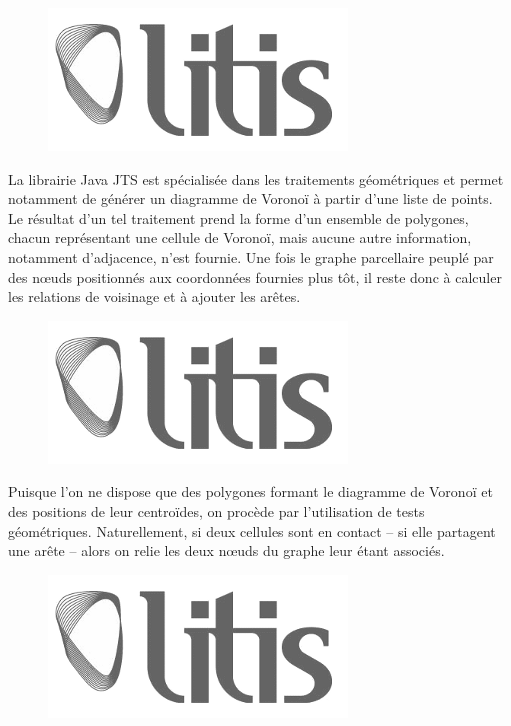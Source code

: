 \documentclass[12pt]{article}
\begin{document}
\begin{figure}
  \centering
  \includegraphics[width=.6\linewidth]{images/logo-litis.png}
  \caption{}
  \label{fig:construction-bati1}
\end{figure}

La librairie Java JTS \cite{JTS} est spécialisée dans les traitements
géométriques et permet notamment de générer un diagramme de Voronoï à
partir d'une liste de points. Le résultat d'un tel traitement prend la
forme d'un ensemble de polygones, chacun représentant une cellule de
Voronoï, mais aucune autre information, notamment d'adjacence, n'est
fournie. Une fois le graphe parcellaire peuplé par des n\oe uds
positionnés aux coordonnées fournies plus tôt, il reste donc à
calculer les relations de voisinage et à ajouter les arêtes.

\begin{figure}
  \centering
  \includegraphics[width=.6\linewidth]{images/logo-litis.png}
  \caption{}
  \label{fig:construction-bati2}
\end{figure}

Puisque l'on ne dispose que des polygones formant le diagramme de
Voronoï et des positions de leur centroïdes, on procède par
l'utilisation de tests géométriques. Naturellement, si deux cellules
sont en contact -- si elle partagent une arête -- alors on relie les
deux n\oe uds du graphe leur étant associés.

\begin{figure}
  \centering
  \includegraphics[width=.6\linewidth]{images/logo-litis.png}
  \caption{}
  \label{fig:construction-bati3}
\end{figure}
\end{document}
